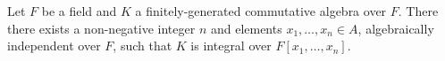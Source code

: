 \documentclass[12pt]{article}
\begin{document}
Let $F$ be a field and $K$ a finitely-generated commutative algebra over $F$.  There there exists a non-negative integer $n$ and elements $x_1,\ldots,x_n\in A$, algebraically independent over $F$, such that $K$ is integral over $F[x_1,\ldots,x_n]$.

\end{document}
